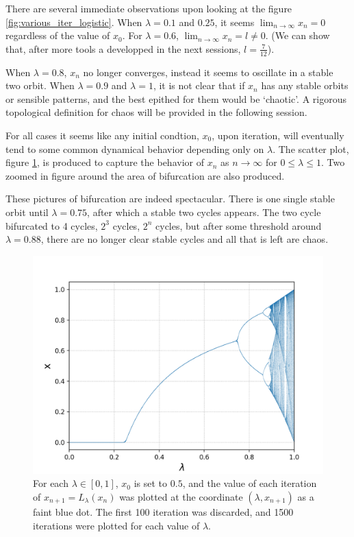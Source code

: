 There are several immediate observations upon looking at the figure \ref{fig:various_iter_logistic}.
When $\lambda = 0.1$ and $0.25$, it seems $\lim_{n \rightarrow \infty} x_n = 0$ regardless of the value of $x_0$.
For $\lambda = 0.6$, $\lim_{n \rightarrow \infty} x_n = l \neq 0$. 
(We can show that, after more tools a developped in the next sessions, $l = \frac{7}{12}$). 

When $\lambda = 0.8$, $x_n$ no longer converges, instead it seems to oscillate in a stable two orbit. When $\lambda = 0.9$ and $\lambda = 1$, it is not clear that if $x_n$ has any stable orbits or sensible patterns, and the best epithed for them would be `chaotic'.
A rigorous topological definition for chaos will be provided in the following session.

For all cases it seems like any initial condtion, $x_0$, upon iteration, will eventually tend to some common dynamical behavior depending only on $\lambda$.
The scatter plot, figure \ref{fig:logistic bifurcation overview}, is produced to capture the behavior of $x_n$ as $n \rightarrow \infty$ for $0 \leq \lambda \leq 1$. 
Two zoomed in figure around the area of bifurcation are also produced.

These pictures of bifurcation are indeed spectacular. 
There is one single stable orbit until $\lambda = 0.75$, after which a stable two cycles appears.
The two cycle bifurcated to 4 cycles, $2^3$ cycles, $2^n$ cycles, but after some threshold around $\lambda = 0.88$, there are no longer clear stable cycles and all that is left are chaos. 


\begin{figure}[htbp]
	\centering
	\label{fig:logistic bifurcation overview}
	\includegraphics[width=\textwidth]{./figures/l_bifurcation_overview.png}
	\caption{For each $\lambda \in [0,1]$, $x_0$ is set to $0.5$, and the value of each iteration of $x_{n+1} = L_{\lambda}(x_n)$ was plotted at the coordinate $(\lambda, x_{n+1})$ as a faint blue dot. 
	The first 100 iteration was discarded, and 1500 iterations were plotted for each value of $\lambda$.}
\end{figure}

